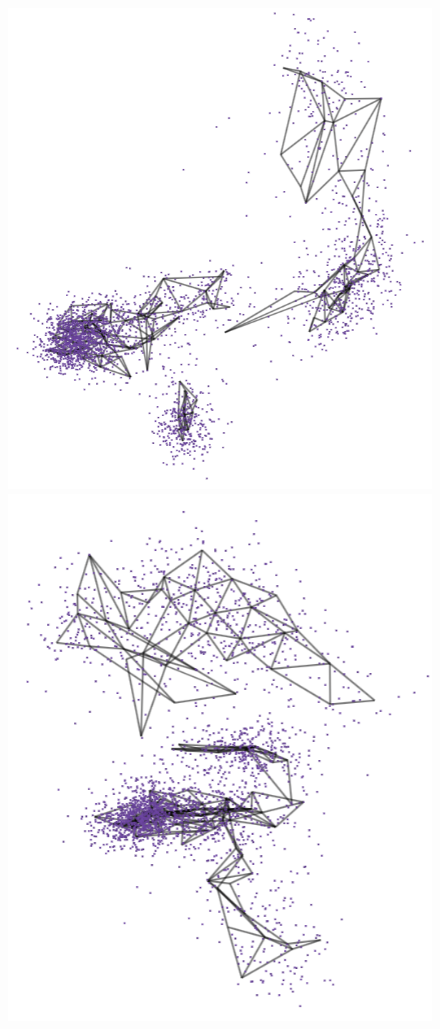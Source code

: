 \documentclass[
  12pt]{article}
\begin{document}
\begin{figure}[H]
\begin{minipage}{0.33\linewidth}
\includegraphics{figures/pbmc3k/sc_2.png}\end{minipage}%
%
\begin{minipage}{0.33\linewidth}
\includegraphics{figures/pbmc3k/sc_3.png}\end{minipage}%


\end{figure}
\end{document}
